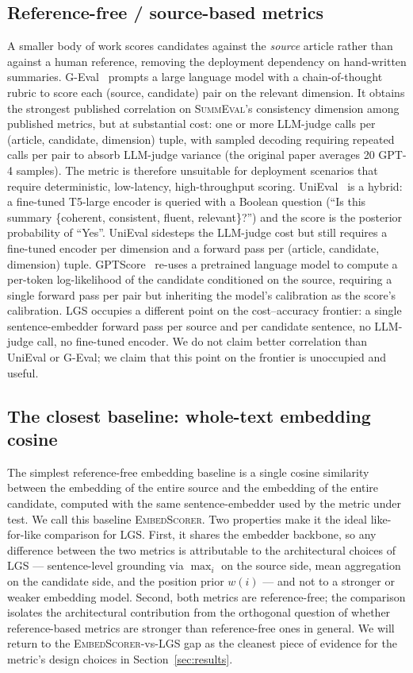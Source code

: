 \documentclass[journal]{IEEEtran}
\begin{document}
\subsection{Reference-free / source-based metrics}
A smaller body of work scores candidates against the \emph{source}
article rather than against a human reference, removing the
deployment dependency on hand-written summaries.
G-Eval~\cite{liu2023geval} prompts a large language model with a
chain-of-thought rubric to score each (source, candidate) pair on
the relevant dimension. It obtains the strongest published
correlation on \textsc{SummEval}'s consistency dimension among
published metrics, but at substantial cost: one or more LLM-judge
calls per (article, candidate, dimension) tuple, with sampled
decoding requiring repeated calls per pair to absorb LLM-judge
variance (the original paper averages 20 GPT-4 samples). The
metric is therefore unsuitable for deployment scenarios that
require deterministic, low-latency, high-throughput scoring.
UniEval~\cite{zhong2022unieval} is a hybrid: a fine-tuned T5-large
encoder is queried with a Boolean question
(``Is this summary \{coherent, consistent, fluent, relevant\}?'')
and the score is the posterior probability of ``Yes''. UniEval
sidesteps the LLM-judge cost but still requires a fine-tuned
encoder per dimension and a forward pass per
(article, candidate, dimension) tuple.
GPTScore~\cite{fu2023gptscore} re-uses a pretrained language model
to compute a per-token log-likelihood of the candidate conditioned
on the source, requiring a single forward pass per pair but
inheriting the model's calibration as the score's calibration.
LGS occupies a different point on the cost--accuracy frontier: a
single sentence-embedder forward pass per source and per candidate
sentence, no LLM-judge call, no fine-tuned encoder. We do not
claim better correlation than UniEval or G-Eval; we claim that
this point on the frontier is unoccupied and useful.

\subsection{The closest baseline: whole-text embedding cosine}
The simplest reference-free embedding baseline is a single cosine
similarity between the embedding of the entire source and the
embedding of the entire candidate, computed with the same
sentence-embedder used by the metric under test. We call this
baseline \textsc{EmbedScorer}. Two properties make it the
ideal like-for-like comparison for LGS. First, it shares the
embedder backbone, so any difference between the two metrics is
attributable to the architectural choices of LGS --- sentence-level
grounding via $\max_i$ on the source side, mean aggregation on the
candidate side, and the position prior $w(i)$ --- and not to a
stronger or weaker embedding model.
Second, both metrics are reference-free; the comparison isolates
the architectural contribution from the orthogonal question of
whether reference-based metrics are stronger than reference-free
ones in general. We will return to the
\textsc{EmbedScorer}-vs-LGS gap as the cleanest piece of evidence
for the metric's design choices in Section~\ref{sec:results}.
\end{document}
